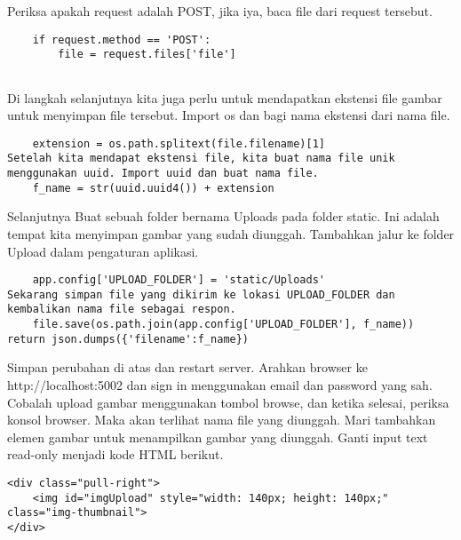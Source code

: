 \documentclass[12pt,a4paper]{article}
\begin{document}
Periksa apakah request adalah POST, jika iya, baca file dari request tersebut.
\begin{verbatim}    
	if request.method == 'POST':
        file = request.files['file']
        
\end{verbatim}
Di langkah selanjutnya kita juga perlu untuk mendapatkan ekstensi file gambar untuk menyimpan file tersebut. Import os dan bagi nama ekstensi dari nama file.
\begin{verbatim}    
	extension = os.path.splitext(file.filename)[1]
Setelah kita mendapat ekstensi file, kita buat nama file unik menggunakan uuid. Import uuid dan buat nama file.
	f_name = str(uuid.uuid4()) + extension
\end{verbatim}
Selanjutnya Buat sebuah folder bernama Uploads pada folder static. Ini adalah tempat kita menyimpan gambar yang sudah diunggah. Tambahkan jalur ke folder Upload dalam pengaturan aplikasi.
\begin{verbatim}
	app.config['UPLOAD_FOLDER'] = 'static/Uploads'
Sekarang simpan file yang dikirim ke lokasi UPLOAD_FOLDER dan kembalikan nama file sebagai respon.
	file.save(os.path.join(app.config['UPLOAD_FOLDER'], f_name))
return json.dumps({'filename':f_name})
\end{verbatim}

Simpan perubahan di atas dan restart server. Arahkan browser ke http://localhost:5002 dan sign in menggunakan email dan password yang sah. Cobalah upload gambar menggunakan tombol browse, dan ketika selesai, periksa konsol browser. Maka akan terlihat nama file yang diunggah.
Mari tambahkan elemen gambar untuk menampilkan gambar yang diunggah. Ganti input text read-only menjadi kode HTML berikut.
\begin{verbatim}
<div class="pull-right">
    <img id="imgUpload" style="width: 140px; height: 140px;" class="img-thumbnail">
</div>
\end{verbatim}
\end{document}
